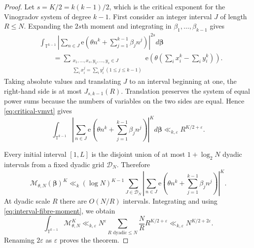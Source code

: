 \documentclass[10pt,a4paper]{amsart}
\newcommand{\T}{\mathbb T}
\newcommand{\cD}{\mathcal D}
\newcommand{\cM}{\mathcal M}
\newcommand{\e}{\mathrm e}
\begin{document}
\begin{proof}
Let $s=K/2=k(k-1)/2$, which is the critical exponent for the Vinogradov system of degree $k-1$.  First consider an integer interval $J$ of length $R\le N$.  Expanding the $2s$th moment and integrating in $\beta_1,\ldots,\beta_{k-1}$ gives
\begin{align*}
  &\int_{\T^{k-1}}
  \left|\sum_{n\in J}
  \e\left(\theta n^k+\sum_{j=1}^{k-1}\beta_jn^j\right)
  \right|^{2s}
  d\boldsymbol\beta\\
  &\qquad=
  \sum_{\substack{x_1,\ldots,x_s,y_1,\ldots,y_s\in J\\
  \sum_i x_i^j=\sum_i y_i^j\ (1\le j\le k-1)}}
  \e\left(\theta\left(\sum_i x_i^k-\sum_i y_i^k\right)\right).
\end{align*}
Taking absolute values and translating $J$ to an interval beginning at one, the right-hand side is at most $J_{s,k-1}(R)$.  Translation preserves the system of equal power sums because the numbers of variables on the two sides are equal.  Hence \eqref{eq:critical-vmvt} gives
\begin{equation}\label{eq:interval-fibre-moment}
  \int_{\T^{k-1}}
  \left|\sum_{n\in J}
  \e\left(\theta n^k+\sum_{j=1}^{k-1}\beta_jn^j\right)
  \right|^{K}
  d\boldsymbol\beta
  \ll_{k,\varepsilon}R^{K/2+\varepsilon}.
\end{equation}

Every initial interval $[1,L]$ is the disjoint union of at most $1+\log_2N$ dyadic intervals from a fixed dyadic grid $\cD_N$.  Therefore
\[
  \cM_{\theta,N}(\boldsymbol\beta)^K
  \ll_k
  (\log N)^{K-1}
  \sum_{J\in\cD_N}
  \left|\sum_{n\in J}
  \e\left(\theta n^k+\sum_{j=1}^{k-1}\beta_jn^j\right)
  \right|^K.
\]
At dyadic scale $R$ there are $O(N/R)$ intervals.  Integrating and using \eqref{eq:interval-fibre-moment}, we obtain
\[
  \int_{\T^{k-1}}\cM_{\theta,N}^K
  \ll_{k,\varepsilon}
  N^\varepsilon
  \sum_{R\text{ dyadic}\le N}
  \frac NR R^{K/2+\varepsilon}
  \ll_{k,\varepsilon}N^{K/2+2\varepsilon}.
\]
Renaming $2\varepsilon$ as $\varepsilon$ proves the theorem.
\end{proof}
\end{document}
